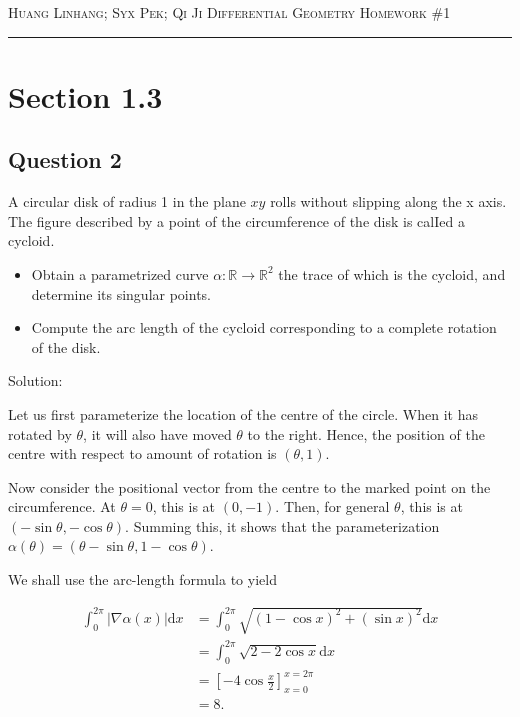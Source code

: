 \documentclass[12pt]{article}
\begin{document}
\thispagestyle{empty}

{\scshape Huang Linhang; Syx Pek; Qi Ji} \hfill {\scshape \large Differential Geometry} \hfill {\scshape Homework \#1}

\smallskip
\hrule
\bigskip

\section{Section 1.3}

\subsection*{Question 2}

A circular disk of radius 1 in the plane $xy$ rolls without slipping along the x
axis. The figure described by a point of the circumference of the disk is calIed a
cycloid.

\begin{itemize}
     \item Obtain a parametrized curve $\alpha : \mathbb{R} \to \mathbb{R}^2$ the trace of which is the cycloid,
and determine its singular points.
     \item Compute the arc length of the cycloid corresponding to a complete rotation
     of the disk.
\end{itemize}

Solution:

Let us first parameterize the location of the centre of the 
circle. When it has rotated by $\theta$, it will also have moved $\theta$ to the right.
Hence, the position of the centre with respect to amount of rotation is $(\theta, 1)$.

Now consider the positional vector from the centre to the marked point
on the circumference. At $\theta = 0$, this is at $(0, -1)$. Then, for general $\theta$, 
this is at $(-\sin\theta, -\cos\theta)$. Summing this, it shows that the parameterization $\alpha(\theta) = (\theta - \sin\theta, 1 - \cos\theta)$.

We shall use the arc-length formula to yield

\begin{align*}
     \int_0^{2\pi} |\nabla\alpha(x)| \mathrm{d}x 
     &= \int_0^{2\pi} \sqrt{(1-\cos x)^2 + (\sin x)^2} \mathrm{d}x  \\
     &=\int_0^{2\pi} \sqrt{2 - 2\cos{x}} \mathrm{d}x \\
     &= \left[-4\cos{\frac x2}\right]^{x = 2\pi}_{x = 0} \\
     &= 8.
\end{align*}
\end{document}

